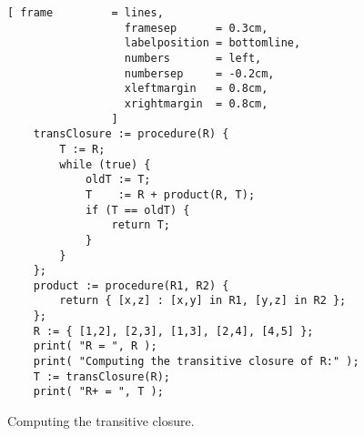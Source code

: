 \begin{figure}[!ht]
  \centering
\begin{Verbatim}[ frame         = lines, 
                  framesep      = 0.3cm, 
                  labelposition = bottomline,
                  numbers       = left,
                  numbersep     = -0.2cm,
                  xleftmargin   = 0.8cm,
                  xrightmargin  = 0.8cm,
                ]
    transClosure := procedure(R) {
        T := R;
        while (true) {
            oldT := T;
            T    := R + product(R, T);
            if (T == oldT) {
                return T;
            }
        }
    };
    product := procedure(R1, R2) {
        return { [x,z] : [x,y] in R1, [y,z] in R2 };
    };
    R := { [1,2], [2,3], [1,3], [2,4], [4,5] };
    print( "R = ", R );
    print( "Computing the transitive closure of R:" );
    T := transClosure(R);
    print( "R+ = ", T );
\end{Verbatim} 
\vspace*{-0.3cm}
\caption{Computing the transitive closure.}  
\label{fig:transitive-closure.stlx}
\end{figure} %

